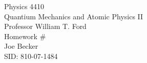 \begin{titlepage}
\setlength{\topmargin}{1.5in}
\begin{center}
\Huge{Physics 4410} \\
\LARGE{Quantium Mechanics and Atomic Physics II} \\
\Large{Professor William T. Ford} \\[1cm]

\huge{Homework \#\HWnum}\\[0.5cm]

\large{Joe Becker} \\
\large{SID: 810-07-1484} \\
\large{\due} 

\end{center}

\end{titlepage}

